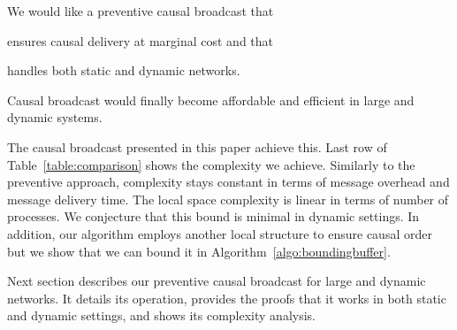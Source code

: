 We would like a preventive causal broadcast that
\begin{inparaenum}[(i)]
\item ensures causal delivery at marginal cost and that
\item handles both static and dynamic networks.
\end{inparaenum}
Causal broadcast would finally become affordable and efficient in large and
dynamic systems.

%     


The causal broadcast presented in this paper achieve this.  Last row of
Table~\ref{table:comparison} shows the complexity we achieve. Similarly to the
preventive approach, complexity stays constant in terms of message overhead and
message delivery time. The local space complexity is linear in terms of number
of processes. We conjecture that this bound is minimal in dynamic settings. In
addition, our algorithm employs another local structure to ensure causal order
but we show that we can bound it in Algorithm~\ref{algo:boundingbuffer}.

Next section describes our preventive causal broadcast for large and dynamic
networks. It details its operation, provides the proofs that it works in both
static and dynamic settings, and shows its complexity analysis.



